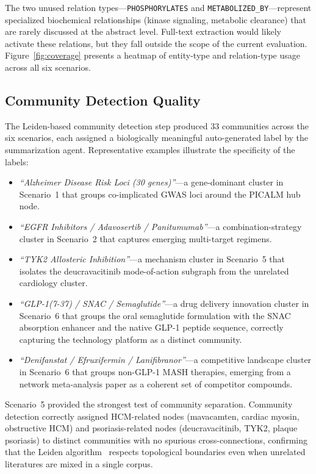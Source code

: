 The two unused relation types---\texttt{PHOSPHORYLATES} and \texttt{METABOLIZED\_BY}---represent specialized biochemical relationships (kinase signaling, metabolic clearance) that are rarely discussed at the abstract level.
Full-text extraction would likely activate these relations, but they fall outside the scope of the current evaluation.
Figure~\ref{fig:coverage} presents a heatmap of entity-type and relation-type usage across all six scenarios.

\subsection{Community Detection Quality}
\label{sec:communities}

The Leiden-based community detection step produced 33 communities across the six scenarios, each assigned a biologically meaningful auto-generated label by the summarization agent.
Representative examples illustrate the specificity of the labels:

\begin{itemize}
  \item \emph{``Alzheimer Disease Risk Loci (30 genes)''}---a gene-dominant cluster in Scenario~1 that groups co-implicated GWAS loci around the PICALM hub node.
  \item \emph{``EGFR Inhibitors / Adavosertib / Panitumumab''}---a combination-strategy cluster in Scenario~2 that captures emerging multi-target regimens.
  \item \emph{``TYK2 Allosteric Inhibition''}---a mechanism cluster in Scenario~5 that isolates the deucravacitinib mode-of-action subgraph from the unrelated cardiology cluster.
  \item \emph{``GLP-1(7-37) / SNAC / Semaglutide''}---a drug delivery innovation cluster in Scenario~6 that groups the oral semaglutide formulation with the SNAC absorption enhancer and the native GLP-1 peptide sequence, correctly capturing the technology platform as a distinct community.
  \item \emph{``Denifanstat / Efruxifermin / Lanifibranor''}---a competitive landscape cluster in Scenario~6 that groups non-GLP-1 MASH therapies, emerging from a network meta-analysis paper as a coherent set of competitor compounds.
\end{itemize}

Scenario~5 provided the strongest test of community separation.
Community detection correctly assigned HCM-related nodes (mavacamten, cardiac myosin, obstructive HCM) and psoriasis-related nodes (deucravacitinib, TYK2, plaque psoriasis) to distinct communities with no spurious cross-connections, confirming that the Leiden algorithm~\cite{traag2019louvain} respects topological boundaries even when unrelated literatures are mixed in a single corpus.


